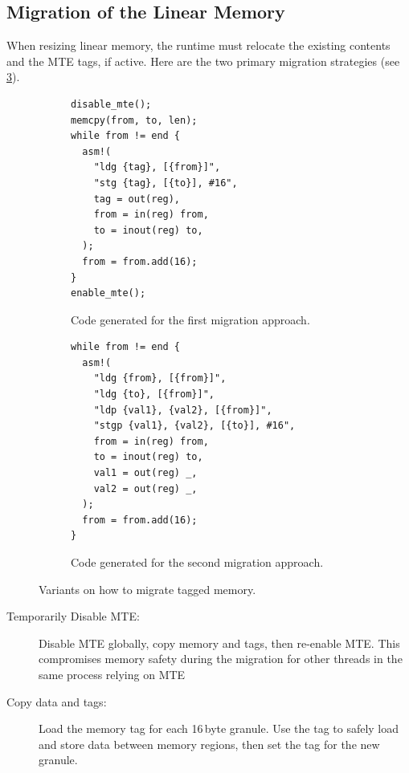 \subsection{Migration of the Linear Memory}
\label{subsec:migration-of-the-linear-memory}

When resizing linear memory, the runtime must relocate the existing contents and the \ac{MTE} tags, if active.
Here are the two primary migration strategies (see \cref{fig:migrating-memory}).

\begin{figure}[h]
  \centering
  \begin{subfigure}[T]{0.45\textwidth}
    \centering
    \begin{lstlisting}[frame=h,style=customc,label={lst:migrating-memory-disable}]
disable_mte();
memcpy(from, to, len);
while from != end {
  asm!(
    "ldg {tag}, [{from}]",
    "stg {tag}, [{to}], #16",
    tag = out(reg),
    from = in(reg) from,
    to = inout(reg) to,
  );
  from = from.add(16);
}
enable_mte();
    \end{lstlisting}
    \caption{Code generated for the first migration approach.}
    \label{fig:migrating-memory-disable}
  \end{subfigure}
  \hfill
  \begin{subfigure}[T]{0.45\textwidth}
    \centering
    \begin{lstlisting}[frame=h,style=customc,label={lst:migrating-memory-tags}]
while from != end {
  asm!(
    "ldg {from}, [{from}]",
    "ldg {to}, [{from}]",
    "ldp {val1}, {val2}, [{from}]",
    "stgp {val1}, {val2}, [{to}], #16",
    from = in(reg) from,
    to = inout(reg) to,
    val1 = out(reg) _,
    val2 = out(reg) _,
  );
  from = from.add(16);
}
    \end{lstlisting}
    \caption{Code generated for the second migration approach.}
    \label{fig:migrating-memory-tags}
  \end{subfigure}
  \caption{Variants on how to migrate tagged memory.}
  \label{fig:migrating-memory}
\end{figure}

\begin{description}
  \item[Temporarily Disable MTE:]
  Disable MTE globally, copy memory and tags, then re-enable \ac{MTE}.
  This compromises memory safety during the migration for other threads in the same process relying on \ac{MTE}

  \item[Copy data and tags:]
  Load the memory tag for each 16\,byte granule.
  Use the tag to safely load and store data between memory regions, then set the tag for the new granule.

\end{description}

